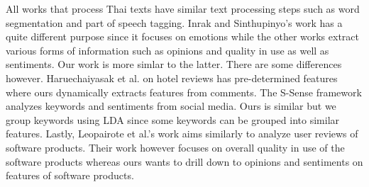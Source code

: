All works that process Thai texts have similar text processing steps such as word segmentation and part of speech tagging. Inrak and Sinthupinyo's work \cite{emotioninthai} has a quite different purpose since it focuses on emotions while the other works \cite{thaiopinionmininghotel,ssense,ssense2,leopairote1,leopairote2} extract various forms of information such as opinions and quality in use as well as sentiments. Our work is more simlar to the latter. There are some differences however. Haruechaiyasak et al. \cite{thaiopinionmininghotel} on hotel reviews has pre-determined features where ours dynamically extracts features from comments. The S-Sense framework \cite{ssense,ssense2} analyzes keywords and sentiments from social media. Ours is similar but we group keywords using LDA since some keywords can be grouped into similar features. Lastly, Leopairote et al.'s work \cite{leopairote1,leopairote2} aims similarly to analyze user reviews of software products. Their work however focuses on overall quality in use of the software products whereas ours wants to drill down to opinions and sentiments on features of software products.



